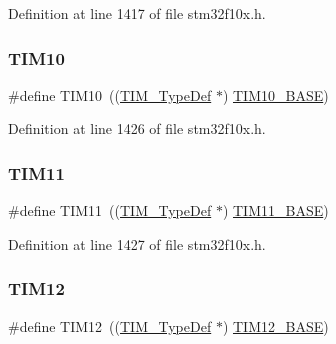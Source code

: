 Definition at line 1417 of file stm32f10x.\+h.

\mbox{\label{group___peripheral__declaration_ga46b2ad3f5f506f0f8df0d2ec3e767267}} 
\subsubsection{\texorpdfstring{T\+I\+M10}{TIM10}}
{\footnotesize\ttfamily \#define T\+I\+M10~((\hyperlink{struct_t_i_m___type_def}{T\+I\+M\+\_\+\+Type\+Def} $\ast$) \hyperlink{group___peripheral__memory__map_ga3eff32f3801db31fb4b61d5618cad54a}{T\+I\+M10\+\_\+\+B\+A\+SE})}



Definition at line 1426 of file stm32f10x.\+h.

\mbox{\label{group___peripheral__declaration_gacfd11ef966c7165f57e2cebe0abc71ad}} 
\subsubsection{\texorpdfstring{T\+I\+M11}{TIM11}}
{\footnotesize\ttfamily \#define T\+I\+M11~((\hyperlink{struct_t_i_m___type_def}{T\+I\+M\+\_\+\+Type\+Def} $\ast$) \hyperlink{group___peripheral__memory__map_ga3a4a06bb84c703084f0509e105ffaf1d}{T\+I\+M11\+\_\+\+B\+A\+SE})}



Definition at line 1427 of file stm32f10x.\+h.

\mbox{\label{group___peripheral__declaration_ga2397f8a0f8e7aa10cf8e8c049e431e53}} 
\subsubsection{\texorpdfstring{T\+I\+M12}{TIM12}}
{\footnotesize\ttfamily \#define T\+I\+M12~((\hyperlink{struct_t_i_m___type_def}{T\+I\+M\+\_\+\+Type\+Def} $\ast$) \hyperlink{group___peripheral__memory__map_ga33dea32fadbaecea161c2ef7927992fd}{T\+I\+M12\+\_\+\+B\+A\+SE})}




